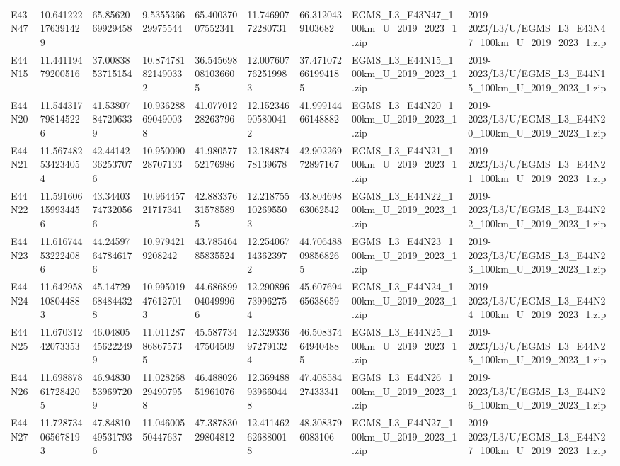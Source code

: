 \begin{landscape}
\begin{longtable}{lllllllll}
E43N47 & 10.641222176391429 & 65.8562069929458 & 9.535536629975544 & 65.40037007552341 & 11.74690772280731 & 66.3120439103682 & EGMS\_L3\_E43N47\_100km\_U\_2019\_2023\_1.zip & 2019-2023/L3/U/EGMS\_L3\_E43N47\_100km\_U\_2019\_2023\_1.zip \\
E44N15 & 11.44119479200516 & 37.0083853715154 & 10.874781821490332 & 36.545698081036605 & 12.007607762519983 & 37.471072661994185 & EGMS\_L3\_E44N15\_100km\_U\_2019\_2023\_1.zip & 2019-2023/L3/U/EGMS\_L3\_E44N15\_100km\_U\_2019\_2023\_1.zip \\
E44N20 & 11.544317798145226 & 41.53807847206339 & 10.936288690490038 & 41.07701228263796 & 12.152346905800412 & 41.99914466148882 & EGMS\_L3\_E44N20\_100km\_U\_2019\_2023\_1.zip & 2019-2023/L3/U/EGMS\_L3\_E44N20\_100km\_U\_2019\_2023\_1.zip \\
E44N21 & 11.567482534234054 & 42.44142362537076 & 10.95009028707133 & 41.98057752176986 & 12.18487478139678 & 42.90226972897167 & EGMS\_L3\_E44N21\_100km\_U\_2019\_2023\_1.zip & 2019-2023/L3/U/EGMS\_L3\_E44N21\_100km\_U\_2019\_2023\_1.zip \\
E44N22 & 11.591606159934456 & 43.34403747320566 & 10.96445721717341 & 42.883376315785895 & 12.218755102695503 & 43.80469863062542 & EGMS\_L3\_E44N22\_100km\_U\_2019\_2023\_1.zip & 2019-2023/L3/U/EGMS\_L3\_E44N22\_100km\_U\_2019\_2023\_1.zip \\
E44N23 & 11.616744532224086 & 44.24597647846176 & 10.9794219208242 & 43.78546485835524 & 12.254067143623972 & 44.706488098568265 & EGMS\_L3\_E44N23\_100km\_U\_2019\_2023\_1.zip & 2019-2023/L3/U/EGMS\_L3\_E44N23\_100km\_U\_2019\_2023\_1.zip \\
E44N24 & 11.642958108044883 & 45.14729684844328 & 10.995019476127013 & 44.686899040499966 & 12.290896739962754 & 45.60769465638659 & EGMS\_L3\_E44N24\_100km\_U\_2019\_2023\_1.zip & 2019-2023/L3/U/EGMS\_L3\_E44N24\_100km\_U\_2019\_2023\_1.zip \\
E44N25 & 11.67031242073353 & 46.04805456222499 & 11.011287868675735 & 45.58773447504509 & 12.329336972791324 & 46.508374649404885 & EGMS\_L3\_E44N25\_100km\_U\_2019\_2023\_1.zip & 2019-2023/L3/U/EGMS\_L3\_E44N25\_100km\_U\_2019\_2023\_1.zip \\
E44N26 & 11.698878617284205 & 46.94830539697209 & 11.028268294907958 & 46.48802651961076 & 12.369488939660448 & 47.40858427433341 & EGMS\_L3\_E44N26\_100km\_U\_2019\_2023\_1.zip & 2019-2023/L3/U/EGMS\_L3\_E44N26\_100km\_U\_2019\_2023\_1.zip \\
E44N27 & 11.728734065678193 & 47.84810495317936 & 11.04600550447637 & 47.38783029804812 & 12.411462626880018 & 48.3083796083106 & EGMS\_L3\_E44N27\_100km\_U\_2019\_2023\_1.zip & 2019-2023/L3/U/EGMS\_L3\_E44N27\_100km\_U\_2019\_2023\_1.zip \\

\end{longtable}
\end{landscape}
